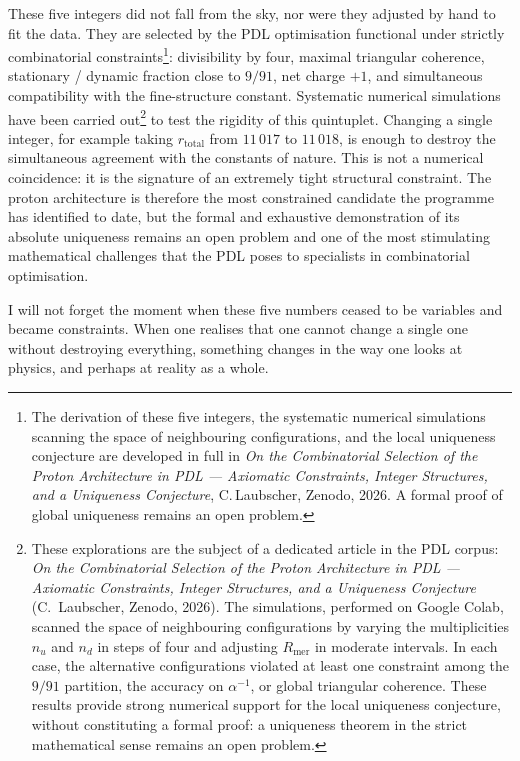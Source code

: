 \documentclass[12pt, a4paper, openright]{book}
\begin{document}
These five integers did not fall from the sky, nor were they adjusted by hand to fit the data. They are selected by the PDL optimisation functional under strictly combinatorial constraints\footnote{The derivation of these five integers, the systematic numerical simulations scanning the space of neighbouring configurations, and the local uniqueness conjecture are developed in full in \textit{On the Combinatorial Selection of the Proton Architecture in PDL --- Axiomatic Constraints, Integer Structures, and a Uniqueness Conjecture}, C.\,Laubscher, Zenodo, 2026. A formal proof of global uniqueness remains an open problem.}: divisibility by four, maximal triangular coherence, stationary / dynamic fraction close to $9/91$, net charge $+1$, and simultaneous compatibility with the fine-structure constant. Systematic numerical simulations have been carried out\footnote{These explorations are the subject of a dedicated article in the PDL corpus: \emph{On the Combinatorial Selection of the Proton Architecture in PDL --- Axiomatic Constraints, Integer Structures, and a Uniqueness Conjecture} (C.~Laubscher, Zenodo, 2026). The simulations, performed on Google Colab, scanned the space of neighbouring configurations by varying the multiplicities $n_u$ and $n_d$ in steps of four and adjusting $R_\text{mer}$ in moderate intervals. In each case, the alternative configurations violated at least one constraint among the $9/91$ partition, the accuracy on $\alpha^{-1}$, or global triangular coherence. These results provide strong numerical support for the local uniqueness conjecture, without constituting a formal proof: a uniqueness theorem in the strict mathematical sense remains an open problem.} to test the rigidity of this quintuplet. Changing a single integer, for example taking $r_\text{total}$ from $11\,017$ to $11\,018$, is enough to destroy the simultaneous agreement with the constants of nature. This is not a numerical coincidence: it is the signature of an extremely tight structural constraint. The proton architecture is therefore the most constrained candidate the programme has identified to date, but the formal and exhaustive demonstration of its absolute uniqueness remains an open problem and one of the most stimulating mathematical challenges that the PDL poses to specialists in combinatorial optimisation.

\medskip

I will not forget the moment when these five numbers ceased to be variables and became constraints. When one realises that one cannot change a single one without destroying everything, something changes in the way one looks at physics, and perhaps at reality as a whole.
\end{document}
